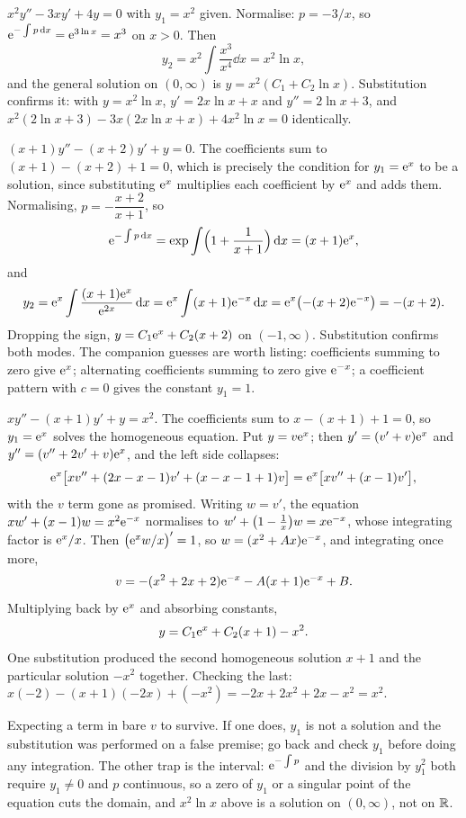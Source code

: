 \begin{worked}
$x^{2}y''-3xy'+4y=0$ with $y_1=x^{2}$ given. Normalise: $p=-3/x$, so $\mathrm{e}^{-\int p\,\mathrm{d} x}=\mathrm{e}^{3\ln x}=x^{3}$ on $x>0$. Then
\[y_2=x^{2}\int\frac{x^{3}}{x^{4}}\dd x=x^{2}\ln x,\]
and the general solution on $(0,\infty)$ is $y=x^{2}(C_1+C_2\ln x)$. Substitution confirms it: with $y=x^{2}\ln x$, $y'=2x\ln x+x$ and $y''=2\ln x+3$, and $x^{2}(2\ln x+3)-3x(2x\ln x+x)+4x^{2}\ln x=0$ identically.
\end{worked}

\begin{worked}
$(x+1)y''-(x+2)y'+y=0$. The coefficients sum to $(x+1)-(x+2)+1=0$, which is precisely the condition for $y_1=\mathrm{e}^{x}$ to be a solution, since substituting $\mathrm{e}^{x}$ multiplies each coefficient by $\mathrm{e}^{x}$ and adds them. Normalising, $p=-\dfrac{x+2}{x+1}$, so
\[\mathrm{e}^{-\int p\,\mathrm{d} x}=\exp\int\Bigl(1+\frac{1}{x+1}\Bigr)\,\mathrm{d} x=(x+1)\mathrm{e}^{x},\]
and
\[y_2=\mathrm{e}^{x}\int\frac{(x+1)\mathrm{e}^{x}}{\mathrm{e}^{2x}}\,\mathrm{d} x=\mathrm{e}^{x}\int(x+1)\mathrm{e}^{-x}\,\mathrm{d} x=\mathrm{e}^{x}\bigl(-(x+2)\mathrm{e}^{-x}\bigr)=-(x+2).\]
Dropping the sign, $y=C_1\mathrm{e}^{x}+C_2(x+2)$ on $(-1,\infty)$. Substitution confirms both modes. The companion guesses are worth listing: coefficients summing to zero give $\mathrm{e}^{x}$; alternating coefficients summing to zero give $\mathrm{e}^{-x}$; a coefficient pattern with $c=0$ gives the constant $y_1=1$.
\end{worked}

\begin{worked}
$xy''-(x+1)y'+y=x^{2}$. The coefficients sum to $x-(x+1)+1=0$, so $y_1=\mathrm{e}^{x}$ solves the homogeneous equation. Put $y=v\mathrm{e}^{x}$; then $y'=(v'+v)\mathrm{e}^{x}$ and $y''=(v''+2v'+v)\mathrm{e}^{x}$, and the left side collapses:
\[\mathrm{e}^{x}\bigl[xv''+(2x-x-1)v'+(x-x-1+1)v\bigr]=\mathrm{e}^{x}\bigl[xv''+(x-1)v'\bigr],\]
with the $v$ term gone as promised. Writing $w=v'$, the equation $xw'+(x-1)w=x^{2}\mathrm{e}^{-x}$ normalises to $w'+\bigl(1-\tfrac1x\bigr)w=x\mathrm{e}^{-x}$, whose integrating factor is $\mathrm{e}^{x}/x$. Then $\bigl(\mathrm{e}^{x}w/x\bigr)'=1$, so $w=(x^{2}+Ax)\mathrm{e}^{-x}$, and integrating once more,
\[v=-(x^{2}+2x+2)\mathrm{e}^{-x}-A(x+1)\mathrm{e}^{-x}+B.\]
Multiplying back by $\mathrm{e}^{x}$ and absorbing constants,
\[y=C_1\mathrm{e}^{x}+C_2(x+1)-x^{2}.\]
One substitution produced the second homogeneous solution $x+1$ and the particular solution $-x^{2}$ together. Checking the last: $x(-2)-(x+1)(-2x)+(-x^{2})=-2x+2x^{2}+2x-x^{2}=x^{2}$.
\end{worked}

\begin{trap}
Expecting a term in bare $v$ to survive. If one does, $y_1$ is not a solution and the substitution was performed on a false premise; go back and check $y_1$ before doing any integration. The other trap is the interval: $\mathrm{e}^{-\int p}$ and the division by $y_1^{2}$ both require $y_1\ne0$ and $p$ continuous, so a zero of $y_1$ or a singular point of the equation cuts the domain, and $x^{2}\ln x$ above is a solution on $(0,\infty)$, not on $\mathbb{R}$.
\end{trap}

